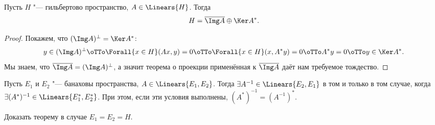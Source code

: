 \documentclass[main]{subfiles}
\begin{document}

\begin{theorem}\label{thm:conjugate-complement}%
  Пусть $H$ "--- гильбертово пространство,
  \( A \in \Linears{H} \). Тогда
  \[
    H = \overline{\Img A} \oplus \Ker A^*.
  \]
\end{theorem}
\begin{proof}
  Покажем, что $(\Img A)^\perp = \Ker A^*$:
  \[
    y \in (\Img A)^\perp
    \oTTo \Forall{x \in H} (Ax, y) = 0
    \oTTo \Forall{x \in H} (x, A^* y) = 0
    \oTTo A^* y = 0
    \oTTo y \in \Ker A^*.
  \]
  Мы знаем, что
  \( \overline{\Img A} = (\Img A)^\perp \),
  а значит теорема о проекции
  применённая к \( \overline{\Img A} \)
  даёт нам требуемое тождество.
\end{proof}


\begin{theorem}[б/д]%
  Пусть \( E_1 \) и \( E_2 \) "--- банаховы пространства,
  \( A \in \Linears{E_1, E_2} \).
  Тогда
  \( \exists A^{-1} \in \Linears{E_2, E_1} \)
  в том и только в том случае,
  когда \( \exists (A^*)^{-1} \in \Linears{E_1^*, E_2^*} \).
  При этом, если эти условия выполнены,
  \( (A^*)^{-1} = (A^{-1})^* \).
\end{theorem}

\begin{exercise}
  Доказать теорему в случае \( E_1 = E_2 = H \).
\end{exercise}
\end{document}
